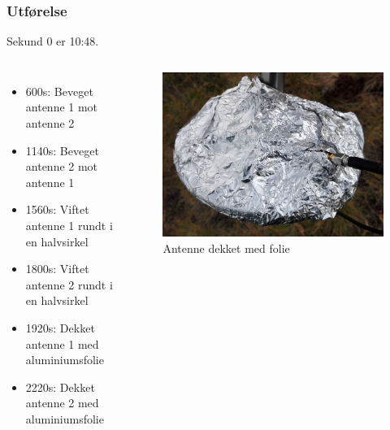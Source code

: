 \documentclass[xcolor=table]{beamer}
\begin{document}
\begin{frame}
\frametitle{Utførelse}
Sekund 0 er 10:48.
  \begin{columns}
      \begin{itemize}
        \item 600s: Beveget antenne 1 mot antenne 2
        \item 1140s: Beveget antenne 2 mot antenne 1
        \item 1560s: Viftet antenne 1 rundt i en halvsirkel
        \item 1800s: Viftet antenne 2 rundt i en halvsirkel
        \item 1920s: Dekket antenne 1 med aluminiumsfolie
        \item 2220s: Dekket antenne 2 med aluminiumsfolie
      \end{itemize}
      \begin{figure}
        \includegraphics[scale=0.20]{thesis/graphics/antenna_foil_cover.jpg}
        \caption{Antenne dekket med folie}
      \end{figure}  
    \end{columns}  
\end{frame}
\end{document}
